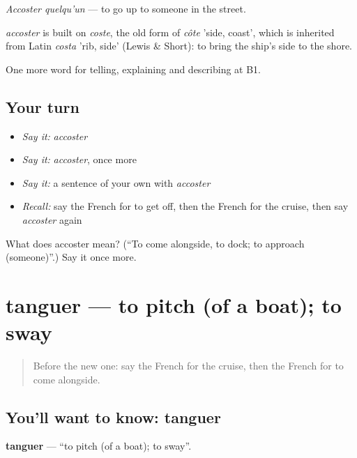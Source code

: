 \emph{Accoster quelqu'un} — to go up to someone in the street.

\begin{cousinweb}
\emph{accoster} is built on \emph{coste}, the old form of \emph{côte} 'side, coast', which is inherited from Latin \emph{costa} 'rib, side' (Lewis \& Short): to bring the ship's side to the shore.
\end{cousinweb}

\begin{grammarlens}[title={What you've built}]
One more word for telling, explaining and describing at B1.
\end{grammarlens}

\subsection*{Your turn}
\begin{itemize}
\raggedright
  \item \emph{Say it:} \emph{accoster}
  \item \emph{Say it:} \emph{accoster}, once more
  \item \emph{Say it:} a sentence of your own with \emph{accoster}
  \item \emph{Recall:} say the French for to get off, then the French for the cruise, then say \emph{accoster} again
\end{itemize}

\begin{tcolorbox}[breakable,colback=teal!4,colframe=teal!35!black,title={Before you move on}]
What does accoster mean? (\textquotedblleft{}To come alongside, to dock; to approach (someone)\textquotedblright{}.) Say it once more.
\end{tcolorbox}
\section[tanguer]{tanguer — to pitch (of a boat); to sway}

\label{lesson:FR-C423-tanguer}



\begin{quote}
Before the new one: say the French for the cruise, then the French for to come alongside.
\end{quote}

\subsection*{You'll want to know: tanguer}
\textbf{tanguer} — \textquotedblleft{}to pitch (of a boat); to sway\textquotedblright{}.

